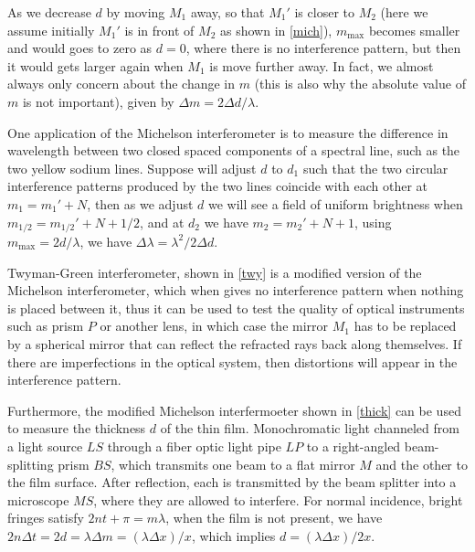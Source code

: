 \documentclass[english,a4paper,12pt]{report}
\begin{document}
As we decrease \(d\) by moving \(M_1 \) away, so that \(M_1 '\) is closer to \(M_2 \) (here we assume initially \(M_1 '\) is in front of \(M_2 \) as shown in \cref{mich}), \(m_{\text{max} } \) becomes smaller and would goes to zero as \(d = 0\), where there is no interference pattern, but then it would gets larger again when \(M_1 \) is move further away. In fact, we almost always only concern about the change in \(m\) (this is also why the absolute value of \(m\) is not important), given by \(\Delta m = 2 \Delta d/\lambda \).

One application of the Michelson interferometer is to measure the difference in wavelength between two closed spaced components of a spectral line, such as the two yellow sodium lines. Suppose will adjust \(d\) to \(d_1 \) such that the two circular interference patterns produced by the two lines coincide with each other at \(m_1  = m_1 ' + N\), then as we adjust \(d\) we will see a field of uniform brightness when \(m_{1/2}   = m_{1/2}  ' + N + 1/2 \), and at \(d_2 \) we have \(m_2  = m_2 ' + N + 1\), using \(m_{\text{max} } = 2d /\lambda  \), we have \(\Delta \lambda = \lambda ^2 /2\Delta d\). 

Twyman-Green interferometer, shown in \cref{twy} is a modified version of the Michelson interferometer, which when gives no interference pattern when nothing is placed between it, thus it can be used to test the quality of optical instruments such as prism \(P\) or another lens, in which case the mirror \(M_1 \) has to be replaced by a spherical mirror that can reflect the refracted rays back along themselves. If there are imperfections in the optical system, then distortions will appear in the interference pattern. 

Furthermore, the modified Michelson interfermoeter shown in \cref{thick} can be used to measure the thickness \(d\) of the thin film. Monochromatic light channeled from a light source \(LS\) through a fiber optic light pipe \(LP\) to a right-angled beam-splitting prism \(BS\), which transmits one beam to a flat mirror \(M\) and the other to the film surface. After reflection, each is transmitted by the beam splitter into a microscope \(MS\), where they are allowed to interfere. For normal incidence, bright fringes satisfy \(2nt + \pi = m\lambda \), when the film is not present, we have \(2n\Delta t = 2d = \lambda \Delta m = (\lambda \Delta x)/x\), which implies \(d = (\lambda \Delta x)/2x\).   


\end{document}
